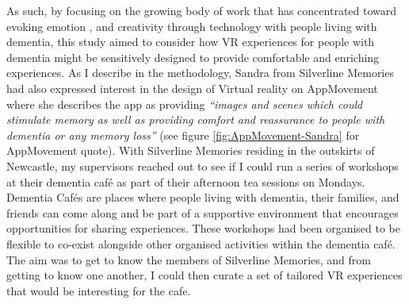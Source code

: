 As such, by focusing on the growing body of work that has concentrated toward evoking emotion \citep{wallace_design-led_2013}, and creativity through technology with people living with dementia, this study aimed to consider how VR experiences for people with dementia might be sensitively designed to provide comfortable and enriching experiences. As I describe in the methodology, Sandra from Silverline Memories had also expressed interest in the design of Virtual reality on AppMovement where she describes the app as providing \textit{``images and scenes which could stimulate memory as well as providing comfort and reassurance to people with dementia or any memory loss''} (see figure \ref{fig:AppMovement-Sandra} for AppMovement quote). With Silverline Memories residing in the outskirts of Newcastle, my supervisors reached out to see if I could run a series of workshops at their dementia café as part of their afternoon tea sessions on Mondays. Dementia Cafés are places where people living with dementia, their families, and friends can come along and be part of a supportive environment that encourages opportunities for sharing experiences. These workshops had been organised to be flexible to co-exist alongside other organised activities within the dementia café. The aim was to get to know the members of Silverline Memories, and from getting to know one another, I could then curate a set of tailored VR experiences that would be interesting for the cafe.

